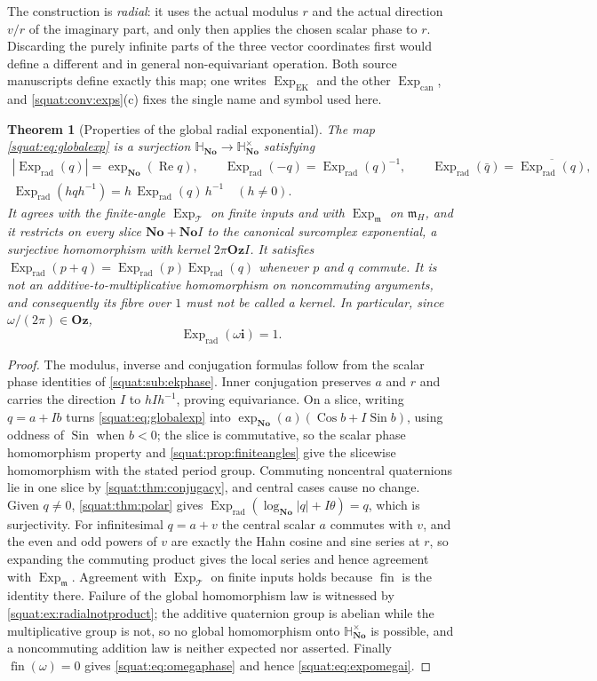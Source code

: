 \documentclass[11pt,letterpaper]{article}
\numberwithin{equation}{section}
\newtheorem{theorem}{Theorem}[section]
\theoremstyle{definition}
\theoremstyle{remark}
\newcommand{\No}{\mathbf{No}}
\newcommand{\SQ}{\mathbb H_{\No}}
\newcommand{\mm}{\mathfrak m}
\newcommand{\Oz}{\mathbf{Oz}}
\newcommand{\ii}{\mathbf i}
\newcommand{\Rea}{\operatorname{Re}}
\newcommand{\fin}{\operatorname{fin}}
\newcommand{\Exp}{\operatorname{Exp}}
\newcommand{\Expm}{\Exp_{\mm}}
\newcommand{\Expt}{\Exp_{\mathcal T}}
\newcommand{\Expr}{\Exp_{\mathrm{rad}}}
\newcommand{\Sin}{\operatorname{Sin}}
\newcommand{\Cos}{\operatorname{Cos}}
\newcommand{\abs}[1]{\left|#1\right|}
\begin{document}
The construction is \emph{radial}: it uses the actual modulus $r$ and the actual direction
$v/r$ of the imaginary part, and only then applies the chosen scalar phase to $r$.
Discarding the purely infinite parts of the three vector coordinates first would define a
different and in general non-equivariant operation. Both source manuscripts define exactly
this map; one writes $\Exp_{\mathrm{EK}}$ and the other $\Exp_{\mathrm{can}}$, and
\cref{squat:conv:exps}(c) fixes the single name and symbol used here.

\begin{theorem}[Properties of the global radial exponential]\label{squat:thm:globalexp}
The map \cref{squat:eq:globalexp} is a surjection $\SQ\to\SQ^\times$ satisfying
\begin{gather*}
 \abs{\Expr(q)}=\exp_{\No}(\Rea q),\qquad
 \Expr(-q)=\Expr(q)^{-1},\qquad
 \Expr(\bar q)=\overline{\Expr(q)},\\
 \Expr(hqh^{-1})=h\,\Expr(q)\,h^{-1}\quad(h\ne0).
\end{gather*}
It agrees with the finite-angle $\Expt$ on finite inputs and with $\Expm$ on $\mm_H$, and
it restricts on every slice $\No+\No I$ to the canonical surcomplex exponential, a
surjective homomorphism with kernel $2\pi\Oz I$. It satisfies
$\Expr(p+q)=\Expr(p)\Expr(q)$ whenever $p$ and $q$ commute. It is \emph{not} an
additive-to-multiplicative homomorphism on noncommuting arguments, and consequently its
fibre over $1$ must not be called a kernel. In particular, since $\omega/(2\pi)\in\Oz$,
\begin{equation}\label{squat:eq:expomegai}
 \Expr(\omega\ii)=1 .
\end{equation}
\end{theorem}
\begin{proof}
The modulus, inverse and conjugation formulas follow from the scalar phase identities of
\cref{squat:sub:ekphase}. Inner conjugation preserves $a$ and $r$ and carries the direction
$I$ to $hIh^{-1}$, proving equivariance. On a slice, writing $q=a+Ib$ turns
\cref{squat:eq:globalexp} into $\exp_{\No}(a)(\Cos b+I\Sin b)$, using oddness of $\Sin$
when $b<0$; the slice is commutative, so the scalar phase homomorphism property and
\cref{squat:prop:finiteangles} give the slicewise homomorphism with the stated period
group. Commuting noncentral quaternions lie in one slice by \cref{squat:thm:conjugacy}, and
central cases cause no change. Given $q\ne0$, \cref{squat:thm:polar} gives
$\Expr(\log_{\No}\abs q+I\theta)=q$, which is surjectivity. For infinitesimal $q=a+v$ the
central scalar $a$ commutes with $v$, and the even and odd powers of $v$ are exactly the
Hahn cosine and sine series at $r$, so expanding the commuting product gives the local
series and hence agreement with $\Expm$. Agreement with $\Expt$ on finite inputs holds
because $\fin$ is the identity there. Failure of the global homomorphism law is witnessed by
\cref{squat:ex:radialnotproduct}; the additive quaternion group is abelian while the
multiplicative group is not, so no global homomorphism onto $\SQ^\times$ is possible, and
a noncommuting addition law is neither expected nor asserted. Finally
$\fin(\omega)=0$ gives \cref{squat:eq:omegaphase} and hence \cref{squat:eq:expomegai}.
\end{proof}
\end{document}
